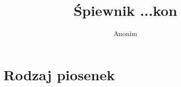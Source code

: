 \documentclass[a4paper,12pt]{book}
\title{Śpiewnik ...kon}
\author{Anonim}
\begin{document}
	\frontmatter
	\maketitle
	
	\tableofcontents

	
	\mainmatter
	
	\chapter{Rodzaj piosenek}
\end{document}
